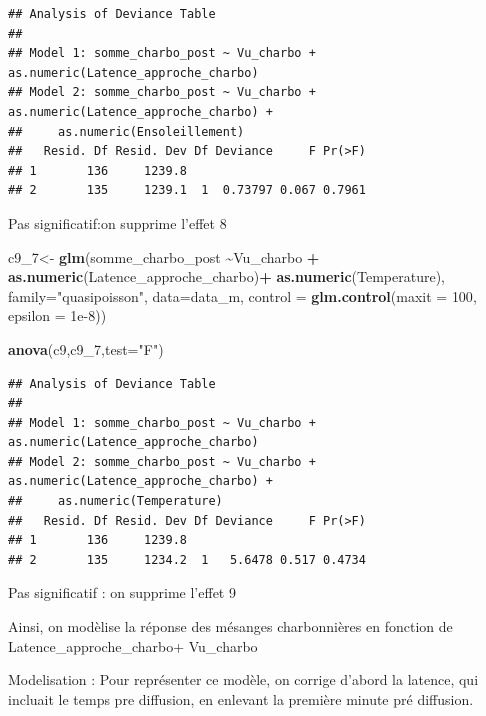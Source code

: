 \documentclass[
  french,
]{article}
\newenvironment{Shaded}{\begin{snugshade}}{\end{snugshade}}
\newcommand{\AttributeTok}[1]{\textcolor[rgb]{0.13,0.29,0.53}{#1}}
\newcommand{\DecValTok}[1]{\textcolor[rgb]{0.00,0.00,0.81}{#1}}
\newcommand{\FloatTok}[1]{\textcolor[rgb]{0.00,0.00,0.81}{#1}}
\newcommand{\FunctionTok}[1]{\textcolor[rgb]{0.13,0.29,0.53}{\textbf{#1}}}
\newcommand{\NormalTok}[1]{#1}
\newcommand{\OtherTok}[1]{\textcolor[rgb]{0.56,0.35,0.01}{#1}}
\newcommand{\SpecialCharTok}[1]{\textcolor[rgb]{0.81,0.36,0.00}{\textbf{#1}}}
\newcommand{\StringTok}[1]{\textcolor[rgb]{0.31,0.60,0.02}{#1}}
\begin{document}
\begin{verbatim}
## Analysis of Deviance Table
## 
## Model 1: somme_charbo_post ~ Vu_charbo + as.numeric(Latence_approche_charbo)
## Model 2: somme_charbo_post ~ Vu_charbo + as.numeric(Latence_approche_charbo) + 
##     as.numeric(Ensoleillement)
##   Resid. Df Resid. Dev Df Deviance     F Pr(>F)
## 1       136     1239.8                         
## 2       135     1239.1  1  0.73797 0.067 0.7961
\end{verbatim}

Pas significatif:on supprime l'effet 8

\begin{Shaded}
\begin{Highlighting}[]
\NormalTok{c9\_7}\OtherTok{\textless{}{-}} \FunctionTok{glm}\NormalTok{(somme\_charbo\_post }\SpecialCharTok{\textasciitilde{}}\NormalTok{Vu\_charbo }\SpecialCharTok{+} \FunctionTok{as.numeric}\NormalTok{(Latence\_approche\_charbo)}\SpecialCharTok{+} \FunctionTok{as.numeric}\NormalTok{(Temperature), }\AttributeTok{family=}\StringTok{"quasipoisson"}\NormalTok{, }\AttributeTok{data=}\NormalTok{data\_m, }
            \AttributeTok{control =} \FunctionTok{glm.control}\NormalTok{(}\AttributeTok{maxit =} \DecValTok{100}\NormalTok{, }\AttributeTok{epsilon =} \FloatTok{1e{-}8}\NormalTok{))}

\FunctionTok{anova}\NormalTok{(c9,c9\_7,}\AttributeTok{test=}\StringTok{"F"}\NormalTok{)}
\end{Highlighting}
\end{Shaded}

\begin{verbatim}
## Analysis of Deviance Table
## 
## Model 1: somme_charbo_post ~ Vu_charbo + as.numeric(Latence_approche_charbo)
## Model 2: somme_charbo_post ~ Vu_charbo + as.numeric(Latence_approche_charbo) + 
##     as.numeric(Temperature)
##   Resid. Df Resid. Dev Df Deviance     F Pr(>F)
## 1       136     1239.8                         
## 2       135     1234.2  1   5.6478 0.517 0.4734
\end{verbatim}

Pas significatif : on supprime l'effet 9

Ainsi, on modèlise la réponse des mésanges charbonnières en fonction de
Latence\_approche\_charbo+ Vu\_charbo

Modelisation : Pour représenter ce modèle, on corrige d'abord la
latence, qui incluait le temps pre diffusion, en enlevant la première
minute pré diffusion.

\begin{Shaded}
\end{Shaded}
\end{document}
